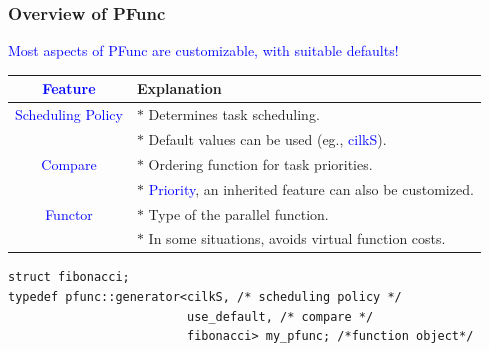 \documentclass{beamer}
\newcommand{\tablefont}{\fontsize{8}{13}\selectfont}
\begin{document}
\begin{frame}[fragile]
\frametitle{Overview of PFunc}

\tablefont
\begin{center}
\textcolor{blue}{Most aspects of PFunc are customizable, with suitable defaults!}
\end{center}

\begin{center}
\tablefont
\begin{tabular}{|c|l|}
\hline
\textcolor{blue}{Feature} & Explanation \\
\hline
\textcolor{blue}{Scheduling Policy} & $\ast{}$ Determines task scheduling. \\
          & $\ast{}$ Default values can be used (eg., \textcolor{blue}{cilkS}). \\
\hline
\textcolor{blue}{Compare} & $\ast{}$ Ordering function for task priorities. \\
      & $\ast{}$ \textcolor{blue}{Priority}, an inherited feature can also be customized. \\
\hline
\textcolor{blue}{Functor} & $\ast{}$ Type of the parallel function. \\
                          & $\ast{}$ In some situations, avoids virtual function costs. \\
\hline
\end{tabular}
\end{center}

\normalsize

\begin{center}
\begin{minipage}{0.6\textwidth}
\begin{lstlisting}
struct fibonacci;
typedef pfunc::generator<cilkS, /* scheduling policy */
                         use_default, /* compare */
                         fibonacci> my_pfunc; /*function object*/
\end{lstlisting}
\end{minipage}
\end{center}

\end{frame}
\end{document}
